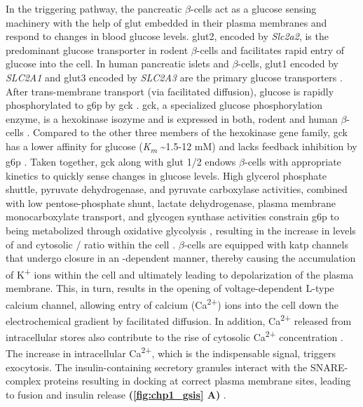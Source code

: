 
\par In the triggering pathway, the pancreatic $\beta$-cells act as a glucose sensing machinery with the help of \gls{glut} embedded in their plasma membranes and respond to changes in blood glucose levels. \gls{glut}2, encoded by \textit{Slc2a2}, is the predominant glucose transporter in rodent $\beta$-cells \textbf{\cite{mcculloch_glut2_2011,van_de_bunt_tale_2012}} and facilitates rapid entry of glucose into the cell. In human pancreatic islets and $\beta$-cells, \gls{glut}1 encoded by \textit{SLC2A1} and \gls{glut}3 encoded by \textit{SLC2A3} are the primary glucose transporters \textbf{\cite{mcculloch_glut2_2011}}. After trans-membrane transport (via facilitated diffusion), glucose is rapidly phosphorylated to \gls{g6p} by \gls{gck} \textbf{\cite{campbell_mechanisms_2021,matschinsky_central_2019}}. \gls{gck}, a specialized glucose phosphorylation enzyme, is a hexokinase isozyme and is expressed in both, rodent and human $\beta$-cells \textbf{\cite{campbell_mechanisms_2021}}. Compared to the other three members of the hexokinase gene family, \gls{gck} has a lower affinity for glucose (\textit{K\textsubscript{m}} \textasciitilde 1.5-12 mM) and lacks feedback inhibition by \gls{g6p} \textbf{\cite{matschinsky_central_2019}}. Taken together, \gls{gck} along with \gls{glut} 1/2 endows $\beta$-cells with appropriate kinetics to quickly sense changes in glucose levels. High glycerol phosphate shuttle, pyruvate dehydrogenase, and pyruvate carboxylase activities, combined with low pentose-phosphate shunt, lactate dehydrogenase, plasma membrane monocarboxylate transport, and glycogen synthase activities constrain \gls{g6p} to being metabolized through oxidative glycolysis \textbf{\cite{matschinsky_central_2019}}, resulting in the increase in levels of  and cytosolic  /  ratio within the cell \textbf{\cite{henquin_triggering_2000}}. $\beta$-cells are equipped with \gls{katp} channels that undergo closure in an -dependent manner, thereby causing the accumulation of K\textsuperscript{+} ions within the cell and ultimately leading to depolarization of the plasma membrane. This, in turn, results in the opening of voltage-dependent L-type calcium channel, allowing entry of calcium (Ca\textsuperscript{2+}) ions into the cell down the electrochemical gradient by facilitated diffusion. In addition, Ca\textsuperscript{2+} released from intracellular stores also contribute to the rise of cytosolic Ca\textsuperscript{2+} concentration \textbf{\cite{yang_ionic_2014}}. The increase in intracellular Ca\textsuperscript{2+}, which is the indispensable signal, triggers exocytosis. The insulin-containing secretory granules interact with the SNARE-complex proteins resulting in docking at correct plasma membrane sites, leading to fusion and insulin release \textbf{(\autoref{fig:chp1_gsis} A)} \textbf{\cite{jewell_exocytosis_2010,chatterjee_bhowmick_conventional_2021}}.   %
